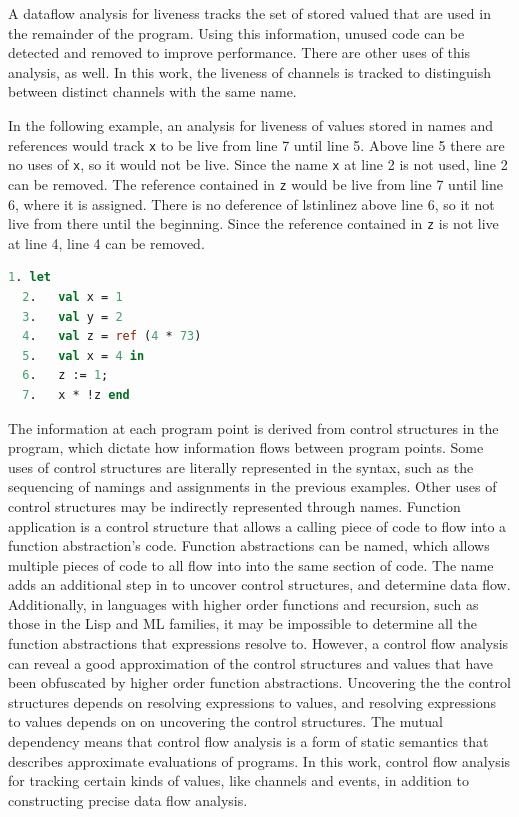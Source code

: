 \documentclass{article}
\begin{document}
A dataflow analysis for liveness tracks the set of stored valued that are used in the
remainder of the program. Using this information, unused code can
be detected and removed to improve performance. There are other uses of this analysis, as well.
In this work, the liveness of channels is tracked to distinguish between distinct channels with
the same name. 

In the following example, an analysis for liveness of values stored in names and references
would track \lstinline{x} to be live from line 7 until line 5. Above line 5 there are no uses
of \lstinline{x}, so it would not be live. Since the name \lstinline{x} at line 2 is not used,
line 2 can be removed. The reference contained in \lstinline{z} would be
live from line 7 until line 6, where it is assigned. There is no deference of lstinline{z}
above line 6, so it not live from there until the beginning. Since the reference contained in
\lstinline{z} is not live at line 4, line 4 can be removed.

\begin{lstlisting}[language=ML, escapechar=\%]
  1. let 
  2.   val x = 1  
  3.   val y = 2
  4.   val z = ref (4 * 73)
  5.   val x = 4 in 
  6.   z := 1; 
  7.   x * !z end
  \end{lstlisting}

The information at each program point is derived from control structures in the program, which
dictate how information flows between program points. Some uses of control structures are
literally represented in the syntax, such as the sequencing of namings and assignments in the
previous examples. Other uses of control structures may be indirectly represented through
names. Function application is a control structure that allows a calling piece of code to
flow into a function abstraction's code.  Function abstractions can be named, which allows
multiple pieces of code to all flow into into the same section of code. The name adds an
additional step in to uncover control structures, and determine data flow.
Additionally, in languages with higher order functions and recursion, such as those in the Lisp
and ML families, it may be impossible to determine all the function abstractions that
expressions resolve to. However, a control flow analysis can reveal a good
approximation of the control structures and values that have been obfuscated by higher order
function abstractions.  Uncovering the the control structures depends on resolving expressions
to values, and resolving expressions to values depends on on uncovering the control
structures. The mutual dependency means that control flow analysis is a form of
static semantics that describes approximate evaluations of programs. In this work, control flow
analysis for tracking certain kinds of values, like channels and events, in addition to
constructing precise data flow analysis. 
\end{document}
